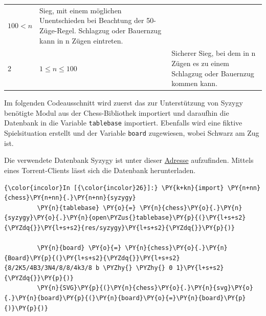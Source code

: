 \begin{longtable}[]{@{}lll@{}}
\begin{minipage}[t]{0.28\columnwidth}
\(100 < n\)\strut
\end{minipage} & \begin{minipage}[t]{0.28\columnwidth}\raggedright\strut
Sieg, mit einem möglichen Unentschieden bei Beachtung der 50-Züge-Regel.
Schlagzug oder Bauernzug kann in n Zügen eintreten.\strut
\end{minipage}\tabularnewline
\begin{minipage}[t]{0.09\columnwidth}\raggedright\strut
2\strut
\end{minipage} & \begin{minipage}[t]{0.28\columnwidth}\raggedright\strut
\(1 \leq n \leq 100\)\strut
\end{minipage} & \begin{minipage}[t]{0.28\columnwidth}\raggedright\strut
Sicherer Sieg, bei dem in n Zügen es zu einem Schlagzug oder Bauernzug
kommen kann.\strut
\end{minipage}\tabularnewline
\bottomrule
\end{longtable}

Im folgenden Codeausschnitt wird zuerst das zur Unterstützung von Syzygy
benötigte Modul aus der Chess-Bibliothek importiert und daraufhin die
Datenbank in die Variable \texttt{tablebase} importiert. Ebenfalls wird
eine fiktive Spielsituation erstellt und der Variable \texttt{board}
zugewiesen, wobei Schwarz am Zug ist.

Die verwendete Datenbank Syzygy ist unter dieser \href{http://oics.olympuschess.com/tracker/index.php}{Adresse} aufzufinden. Mittels eines Torrent-Clients lässt sich die Datenbank herunterladen.


    \begin{Verbatim}[commandchars=\\\{\}]
{\color{incolor}In [{\color{incolor}26}]:} \PY{k+kn}{import} \PY{n+nn}{chess}\PY{n+nn}{.}\PY{n+nn}{syzygy}
         \PY{n}{tablebase} \PY{o}{=} \PY{n}{chess}\PY{o}{.}\PY{n}{syzygy}\PY{o}{.}\PY{n}{open\PYZus{}tablebase}\PY{p}{(}\PY{l+s+s2}{\PYZdq{}}\PY{l+s+s2}{res/syzygy}\PY{l+s+s2}{\PYZdq{}}\PY{p}{)}
         
         \PY{n}{board} \PY{o}{=} \PY{n}{chess}\PY{o}{.}\PY{n}{Board}\PY{p}{(}\PY{l+s+s2}{\PYZdq{}}\PY{l+s+s2}{8/2K5/4B3/3N4/8/8/4k3/8 b \PYZhy{} \PYZhy{} 0 1}\PY{l+s+s2}{\PYZdq{}}\PY{p}{)}
         \PY{n}{SVG}\PY{p}{(}\PY{n}{chess}\PY{o}{.}\PY{n}{svg}\PY{o}{.}\PY{n}{board}\PY{p}{(}\PY{n}{board}\PY{o}{=}\PY{n}{board}\PY{p}{)}\PY{p}{)}
\end{Verbatim}


